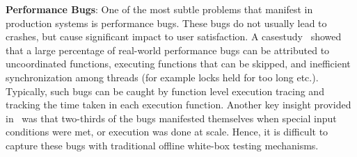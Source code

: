 \noindent
\textbf{Performance Bugs}: One of the most subtle problems that manifest in production systems is performance bugs.
These bugs do not usually lead to crashes, but cause significant impact to user satisfaction.
A casestudy~\cite{shanluPerf} showed that a large percentage of real-world performance bugs can be attributed to uncoordinated functions, executing functions that can be skipped, and inefficient synchronization among threads (for example locks held for too long etc.).
Typically, such bugs can be caught by function level execution tracing and tracking the time taken in each execution function.
Another key insight provided in~\cite{shanluPerf} was that two-thirds of the bugs manifested themselves when special input conditions were met, or execution was done at scale. 
Hence, it is difficult to capture these bugs with traditional offline white-box testing mechanisms.

